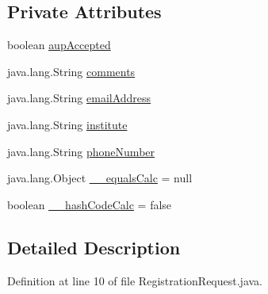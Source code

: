 \subsection*{Private Attributes}
\begin{DoxyCompactItemize}
\item 
boolean \hyperlink{classorg_1_1glite_1_1security_1_1voms_1_1service_1_1registration_1_1RegistrationRequest_aa17781ebf05d8a324058b9c77b6f13db}{aupAccepted}
\item 
java.lang.String \hyperlink{classorg_1_1glite_1_1security_1_1voms_1_1service_1_1registration_1_1RegistrationRequest_adcb05eaf70616f61ffb34f4813c53ed1}{comments}
\item 
java.lang.String \hyperlink{classorg_1_1glite_1_1security_1_1voms_1_1service_1_1registration_1_1RegistrationRequest_a365a6cdc781170ea227509e1cc204f3c}{emailAddress}
\item 
java.lang.String \hyperlink{classorg_1_1glite_1_1security_1_1voms_1_1service_1_1registration_1_1RegistrationRequest_a67d3f7cb40f1659a7181aca6cefbdcb9}{institute}
\item 
java.lang.String \hyperlink{classorg_1_1glite_1_1security_1_1voms_1_1service_1_1registration_1_1RegistrationRequest_a052a5ee4feedb9e29f23cc324067c0a4}{phoneNumber}
\item 
java.lang.Object \hyperlink{classorg_1_1glite_1_1security_1_1voms_1_1service_1_1registration_1_1RegistrationRequest_a9057fc307dd8f0dce02029640539d4a8}{\_\-\_\-equalsCalc} = null
\item 
boolean \hyperlink{classorg_1_1glite_1_1security_1_1voms_1_1service_1_1registration_1_1RegistrationRequest_a1afca46aec9466b1762789d7b7fce8ca}{\_\-\_\-hashCodeCalc} = false
\end{DoxyCompactItemize}


\subsection{Detailed Description}


Definition at line 10 of file RegistrationRequest.java.



